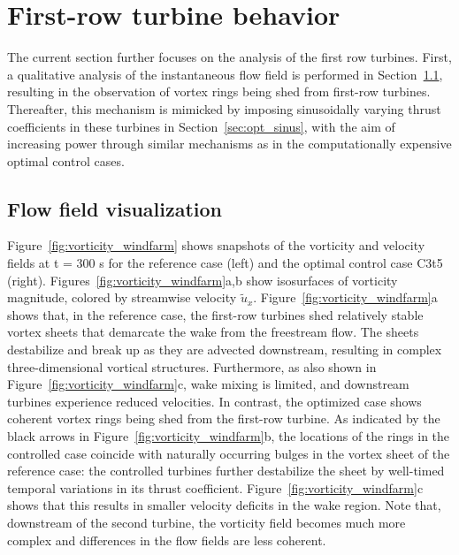 \documentclass[wes, manuscript]{copernicus}
\begin{document}
\section{First-row turbine behavior}\label{sec:analysis_flow_vis}

The current section further focuses on the analysis of the first row turbines. First, a qualitative analysis of the instantaneous flow field is performed in Section~\ref{sec:opt_visualization}, resulting in the observation of vortex rings being shed from first-row turbines. Thereafter, this mechanism is mimicked by imposing sinusoidally varying thrust coefficients in these turbines in Section~\ref{sec:opt_sinus}, with the aim of increasing power through similar mechanisms as in the computationally expensive optimal control cases.

\subsection{Flow field visualization}\label{sec:opt_visualization}
Figure~\ref{fig:vorticity_windfarm} shows snapshots of the vorticity and velocity fields at t = 300 s for the reference case (left) and the optimal control case C3t5 (right). Figures~\ref{fig:vorticity_windfarm}a,b show isosurfaces of vorticity magnitude, colored by streamwise velocity $\widetilde{u}_x$. Figure~\ref{fig:vorticity_windfarm}a shows that, in the reference case, the first-row turbines shed relatively stable vortex sheets that demarcate the wake from the freestream flow. The sheets destabilize and break up as they are advected downstream, resulting in complex three-dimensional vortical structures. Furthermore, as also shown in Figure~\ref{fig:vorticity_windfarm}c, wake mixing is limited, and downstream turbines experience reduced velocities. In contrast, the optimized case shows coherent vortex rings being shed from the first-row turbine. As indicated by the black arrows in Figure~\ref{fig:vorticity_windfarm}b, the locations of the rings in the controlled case coincide with naturally occurring bulges in the vortex sheet of the reference case: the controlled turbines further destabilize the sheet by well-timed temporal variations in its thrust coefficient. Figure~\ref{fig:vorticity_windfarm}c shows that this results in smaller velocity deficits in the wake region. Note that, downstream of the second turbine, the vorticity field becomes much more complex and differences in the flow fields are less coherent. 
\end{document}

